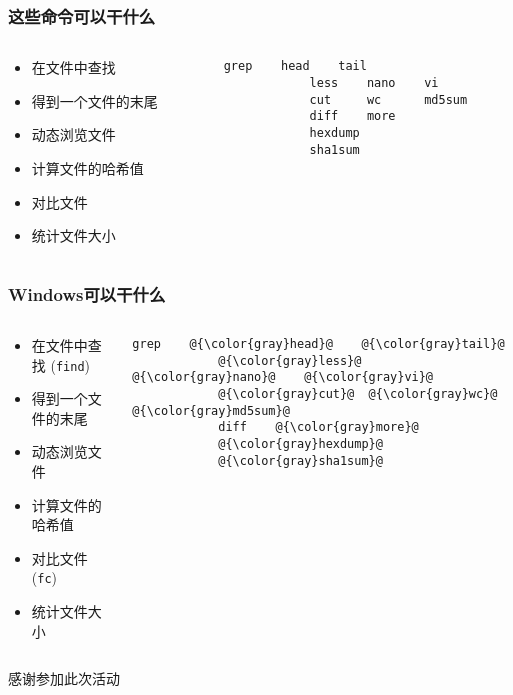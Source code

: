 \begin{frame} [fragile]
	\frametitle{这些命令可以干什么}
	\linespread{1.5}
	\begin{columns}[T]
		\begin{column}[T]{.5\textwidth}
			\begin{itemize}
			\item 在文件中查找
			\item 得到一个文件的末尾
			\item 动态浏览文件
			\item 计算文件的哈希值
			\item 对比文件
			\item 统计文件大小
			\end{itemize}
		\end{column}
		\begin{column}[T]{.5\textwidth}
			\begin{lstlisting}[style=bashstyle, gobble=12, texcl]
			grep	head	tail
			less	nano	vi
			cut		wc		md5sum
			diff	more
			hexdump
			sha1sum
			\end{lstlisting}
		\end{column}
	\end{columns}
\end{frame}

\begin{frame} [fragile]
	\frametitle{Windows可以干什么}
	\linespread{1.5}
	\begin{columns}[T]
		\begin{column}[T]{.5\textwidth}
			\begin{itemize}
			\item 在文件中查找 (\texttt{find})
			\item {\color{gray}得到一个文件的末尾}
			\item {\color{gray}动态浏览文件}
			\item {\color{gray}计算文件的哈希值}
			\item 对比文件 (\texttt{fc})
			\item {\color{gray}统计文件大小}
			\end{itemize}
		\end{column}
		\begin{column}[T]{.5\textwidth}
			\begin{lstlisting}[style=bashstyle, gobble=12, texcl, escapechar=@]
			grep	@{\color{gray}head}@	@{\color{gray}tail}@
			@{\color{gray}less}@	@{\color{gray}nano}@	@{\color{gray}vi}@
			@{\color{gray}cut}@	 @{\color{gray}wc}@	   @{\color{gray}md5sum}@
			diff	@{\color{gray}more}@
			@{\color{gray}hexdump}@
			@{\color{gray}sha1sum}@
			\end{lstlisting}
		\end{column}
	\end{columns}
\end{frame}

\PreLastFrame
\begin{frame}
	\centerline{\fontsize{32}{32}\selectfont 感谢参加此次活动}
\end{frame}

\newpage


